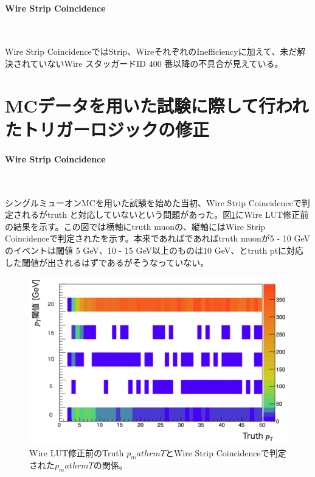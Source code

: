 \paragraph{Wire Strip Coincidence}　　
\par
Wire Strip CoincidenceではStrip、WireそれぞれのInefficiencyに加えて、未だ解決されていないWire スタッガードID 400 番以降の不具合が見えている。

\section{MCデータを用いた試験に際して行われたトリガーロジックの修正}

\paragraph{Wire Strip Coincidence}　　
\par
シングルミューオンMCを用いた試験を始めた当初、Wire Strip Coincidenceで判定される\pt がtruth \pt と対応していないという問題があった。図\ref{pt_before}にWire LUT修正前の結果を示す。この図では横軸にtruth muonの\pt、縦軸にはWire Strip Coincidenceで判定された\pt を示す。本来であればであればtruth muonが5 - 10 GeVのイベントは\pt 閾値 5 GeV、10 - 15 GeV以上のものは10 GeV、とtruth ptに対応した\pt 閾値が出されるはずであるがそうなっていない。

\begin{figure} 
\centering
\includegraphics[width=16cm]{fig/Test/pt_before.png}
\caption[]{Wire LUT修正前のTruth $p_mathrm{T}$とWire Strip Coincidenceで判定された$p_mathrm{T}$の関係。}
\label{pt_before}
\end{figure}

